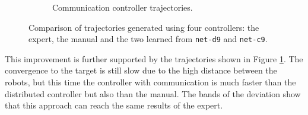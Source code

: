 \begin{figure}[H]
\begin{center}
\begin{subfigure}[h]{0.49\textwidth}
			\caption{Communication controller trajectories.}
		\end{subfigure}
	\end{center}
	\vspace{-0.5cm}
	\caption[Evaluation of the trajectories learned by \texttt{net-c9}.]{Comparison 
	of trajectories generated using four controllers: the expert, the manual and the 
	two learned from \texttt{net-d9} and \texttt{net-c9}.}
	\label{fig:net-c9traj}
\end{figure}

This improvement is further supported by the trajectories shown in Figure 
\ref{fig:net-c9traj}. 
The convergence to the target is still slow due to the high distance between the 
robots, but this time the controller with communication is much faster than the 
distributed controller but also than the manual. The bands of the deviation show 
that this approach can reach the same results of the expert.

